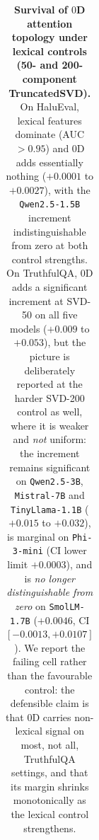 \documentclass{article}
\begin{document}
\begin{table}[ht]
{\begin{tabular}{lcccccc}
\bottomrule
\end{tabular}%
}
\caption{\textbf{Survival of $0$D attention topology under lexical controls (50- and 200-component TruncatedSVD).} On HaluEval, lexical features dominate (AUC $>0.95$) and $0$D adds essentially nothing ($+0.0001$ to $+0.0027$), with the \texttt{Qwen2.5-1.5B} increment indistinguishable from zero at both control strengths. On TruthfulQA, $0$D adds a significant increment at SVD-50 on all five models ($+0.009$ to $+0.053$), but the picture is deliberately reported at the harder SVD-200 control as well, where it is weaker and \emph{not} uniform: the increment remains significant on \texttt{Qwen2.5-3B}, \texttt{Mistral-7B} and \texttt{TinyLlama-1.1B} ($+0.015$ to $+0.032$), is marginal on \texttt{Phi-3-mini} (CI lower limit $+0.0003$), and is \emph{no longer distinguishable from zero} on \texttt{SmolLM-1.7B} ($+0.0046$, CI $[-0.0013,+0.0107]$). We report the failing cell rather than the favourable control: the defensible claim is that $0$D carries non-lexical signal on most, not all, TruthfulQA settings, and that its margin shrinks monotonically as the lexical control strengthens.}
\label{tab:lex_survival}
\end{table}
\end{document}
